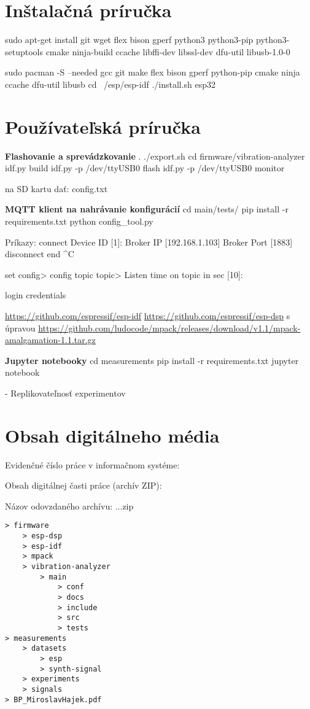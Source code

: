 \thispagestyle{empty}

\chapter{Inštalačná príručka}
\renewcommand*{\thepage}{C-\arabic{page}}

sudo apt-get install git wget flex bison gperf python3 python3-pip python3-setuptools cmake ninja-build ccache libffi-dev libssl-dev dfu-util libusb-1.0-0

sudo pacman -S --needed gcc git make flex bison gperf python-pip cmake ninja ccache dfu-util libusb
cd ~/esp/esp-idf
./install.sh esp32


\thispagestyle{empty}

\chapter{Používateľská príručka}
\renewcommand*{\thepage}{D-\arabic{page}}

\textbf{Flashovanie a sprevádzkovanie}
. ./export.sh
cd firmware/vibration-analyzer
idf.py build
idf.py -p /dev/ttyUSB0 flash
idf.py -p /dev/ttyUSB0 monitor 

na SD kartu dať: config.txt


\textbf{MQTT klient na nahrávanie konfigurácií}
cd  main/tests/
pip install -r requirements.txt
python config\_tool.py

Príkazy:
	connect
		Device ID [1]:
      	Broker IP [192.168.1.103]
        Broker Port [1883]
	disconnect
	end
	^C
	
	set
		config>
	config
	topic
		topic>
		Listen time on topic in sec [10]:
	
	login
	credentials
	
\url{https://github.com/espressif/esp-idf}
\url{https://github.com/espressif/esp-dsp} s úpravou
\url{https://github.com/ludocode/mpack/releases/download/v1.1/mpack-amalgamation-1.1.tar.gz}

\textbf{Jupyter notebooky}
cd measurements
pip install -r requirements.txt
jupyter notebook

- Replikovateľnosť experimentov

	
\thispagestyle{empty}


\chapter{Obsah digitálneho média}
\renewcommand*{\thepage}{E-\arabic{page}}
\par Evidenčné číslo práce v informačnom systéme: \RegNo
\par Obsah digitálnej časti práce (archív ZIP):
\par Názov odovzdaného archívu: ...zip
\begin{verbatim}
> firmware
	> esp-dsp
	> esp-idf
	> mpack
	> vibration-analyzer
		> main
			> conf
			> docs
			> include
			> src
			> tests
> measurements
	> datasets
		> esp
		> synth-signal
	> experiments
	> signals
> BP_MiroslavHajek.pdf
\end{verbatim}


